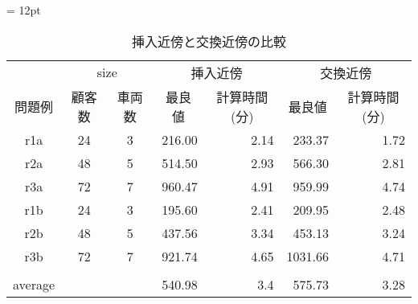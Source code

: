 \begin{table}[]
\tabcolsep = 12pt
\caption{挿入近傍と交換近傍の比較}
\label{insert}
\begin{tabular}{ccccrcr}
\hline
    & \multicolumn{2}{c}{size} & \multicolumn{2}{c}{挿入近傍}                          & \multicolumn{2}{c}{交換近傍}                         \\ \cline{2-7}
問題例 & 顧客数           &  車両数          & 最良値                      & \multicolumn{1}{c}{計算時間(分)} & 最良値                      & \multicolumn{1}{c}{計算時間(分)} \\ \cline{2-7}
r1a & 24          & 3          & \multicolumn{1}{r}{216.00} & 2.14                     & \multicolumn{1}{r}{233.37} & 1.72                    \\
r2a & 48          & 5          & \multicolumn{1}{r}{514.50}  & 2.93                      & \multicolumn{1}{r}{566.30}  & 2.81                     \\
r3a & 72         & 7          & \multicolumn{1}{r}{960.47} & 4.91                   & \multicolumn{1}{r}{959.99} & 4.74                  \\
r1b & 24          & 3          & \multicolumn{1}{r}{195.60} & 2.41                     & \multicolumn{1}{r}{209.95} & 2.48                     \\
r2b & 48          & 5          & \multicolumn{1}{r}{437.56} & 3.34                     & \multicolumn{1}{r}{453.13} & 3.24                     \\
r3b & 72         & 7          & \multicolumn{1}{r}{921.74} & 4.65                  & \multicolumn{1}{r}{1031.66} & 4.71                \\
& \multicolumn{1}{c}{} & \multicolumn{1}{l}{} &                          &                           &                         &                               \\
 \multicolumn{1}{c}{average} & \multicolumn{1}{c}{} &                          &   \multicolumn{1}{r}{540.98}                        &    \multicolumn{1}{r}{3.4}                      &  \multicolumn{1}{r}{575.73}  &     \multicolumn{1}{r}{3.28}                        \\
\hline
\end{tabular}
\end{table}


